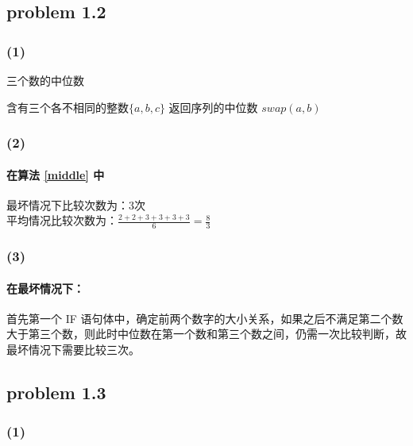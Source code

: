 \documentclass[11pt]{ctexart}
\begin{document}
	\subsection*{problem 1.2}
	\subsubsection*{(1)}
	\begin{algorithm}
		\caption{三个数的中位数}
		\label{middle}
		\begin{algorithmic}[1]
			\Require 含有三个各不相同的整数$\{a,b,c\}$
			\Ensure 返回序列的中位数
			\State $swap(a,b)$
			\EndIf
			\State {}
			\State {}
			\Else 
			\State {}
			\EndIf
			\EndFunction
		\end{algorithmic}
	\end{algorithm}
	
	\subsubsection*{(2)}	
	\paragraph{在算法 \ref{middle} 中}
	最坏情况下比较次数为：3次 \\
	平均情况比较次数为：{\Large$ \frac{2+2+3+3+3+3}{6}=\frac{8}{3}$}
	
	\subsubsection*{(3)}
	\paragraph{在最坏情况下：} 首先第一个 IF 语句体中，确定前两个数字的大小关系，如果之后不满足第二个数大于第三个数，则此时中位数在第一个数和第三个数之间，仍需一次比较判断，故最坏情况下需要比较三次。
	\subsection*{problem 1.3}
	\subsubsection*{(1)}
\end{document}
